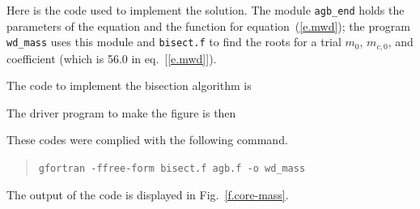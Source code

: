 \documentclass[11pt]{article}
\begin{document}
Here is the code used to implement the solution.  The module \verb|agb_end| holds the parameters of the equation and the function for equation~(\ref{e.mwd}); the program \verb|wd_mass| uses this module and \verb|bisect.f| to find the roots for a trial $m_{0}$, $m_{c,0}$, and coefficient (which is 56.0 in eq.~[\ref{e.mwd}]).

The code to implement the bisection algorithm is

The driver program to make the figure is then

These codes were complied with the following command.
\begin{quote}
\verb|gfortran -ffree-form bisect.f agb.f -o wd_mass|
\end{quote}
The output of the code is displayed in Fig.~\ref{f.core-mass}.
\end{document}
